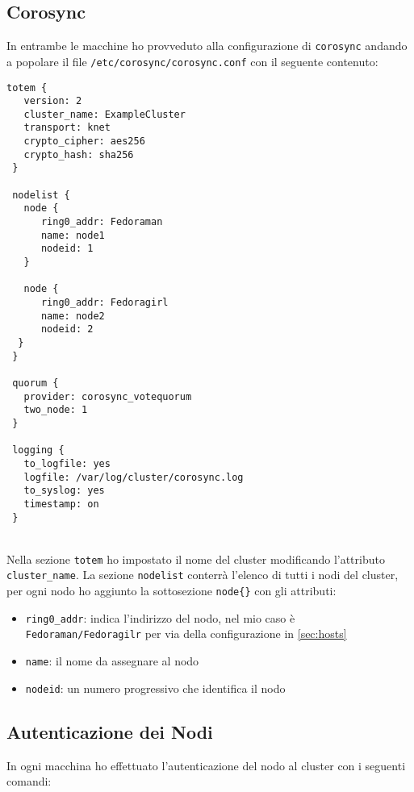 \subsection{Corosync}

In entrambe le macchine ho provveduto alla configurazione di \lstinline[style=cmd]|corosync| andando a popolare il file \lstinline[style=cmd]|/etc/corosync/corosync.conf| con il seguente contenuto:

\begin{lstlisting}[style=cmd]
 totem {
   version: 2
   cluster_name: ExampleCluster
   transport: knet
   crypto_cipher: aes256
   crypto_hash: sha256
 }

 nodelist {
   node {
      ring0_addr: Fedoraman
      name: node1
      nodeid: 1
   }
	
   node {
      ring0_addr: Fedoragirl
      name: node2
      nodeid: 2
  }
 }

 quorum {
   provider: corosync_votequorum
   two_node: 1
 }

 logging {
   to_logfile: yes
   logfile: /var/log/cluster/corosync.log
   to_syslog: yes
   timestamp: on
 }
\end{lstlisting}
\ \\
Nella sezione \lstinline[style=cmd]|totem| ho impostato il nome del cluster modificando l'attributo \lstinline[style=cmd]|cluster_name|. La sezione \lstinline[style=cmd]|nodelist| conterr\`{a} l'elenco di tutti i nodi del cluster, per ogni nodo ho aggiunto la sottosezione \lstinline[style=cmd]|node{}| con gli attributi:

\begin{itemize}
	\item \lstinline[style=cmd]|ring0_addr|: indica l'indirizzo del nodo, nel mio caso \`{e} \lstinline[style=cmd]|Fedoraman/Fedoragilr| per via della configurazione in \autoref{sec:hosts}
	\item \lstinline[style=cmd]|name|: il nome da assegnare al nodo
	\item \lstinline[style=cmd]|nodeid|: un numero progressivo che identifica il nodo
\end{itemize}

\subsection{Autenticazione dei Nodi}

In ogni macchina ho effettuato l'autenticazione del nodo al cluster con i seguenti comandi:

